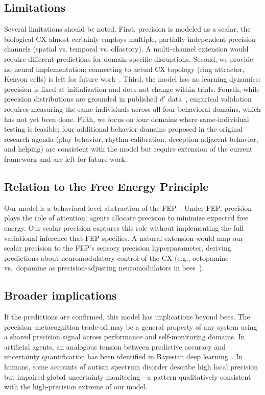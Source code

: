 \documentclass[12pt]{article}
\begin{document}
\subsection*{Limitations}

Several limitations should be noted. First, precision is modeled as a scalar; the biological CX
almost certainly employs multiple, partially independent precision channels (spatial vs. temporal
vs. olfactory). A multi-channel extension would require different predictions for domain-specific
disruptions. Second, we provide no neural implementation; connecting to actual CX topology (ring
attractor, Kenyon cells) is left for future work~\cite{Stone2017CX}. Third, the model has no
learning dynamics: precision is fixed at initialization and does not change within trials.
Fourth, while precision distributions are grounded in published $d'$ data~\cite{AvarWeber2012},
empirical validation requires measuring the same individuals across all four behavioral domains,
which has not yet been done. Fifth, we focus on four domains where same-individual testing is
feasible; four additional behavior domains proposed in the original research agenda (play behavior,
rhythm calibration, deception-adjacent behavior, and helping) are consistent with the model but
require extension of the current framework and are left for future work.

\subsection*{Relation to the Free Energy Principle}

Our model is a behavioral-level abstraction of the FEP~\cite{Friston2010}. Under FEP, precision
plays the role of attention: agents allocate precision to minimize expected free energy. Our
scalar precision captures this role without implementing the full variational inference that FEP
specifies. A natural extension would map our scalar precision to the FEP's sensory precision
hyperparameter, deriving predictions about neuromodulatory control of the CX (e.g., octopamine
vs.\ dopamine as precision-adjusting neuromodulators in bees~\cite{Perry2013}).

\subsection*{Broader implications}

If the predictions are confirmed, this model has implications beyond bees. The
precision--metacognition trade-off may be a general property of any system using a shared
precision signal across performance and self-monitoring domains. In artificial agents, an analogous
tension between predictive accuracy and uncertainty quantification has been identified in Bayesian
deep learning~\cite{Clark2013}. In humans, some accounts of autism spectrum disorder describe high
local precision but impaired global uncertainty monitoring---a pattern qualitatively consistent
with the high-precision extreme of our model.
\end{document}

